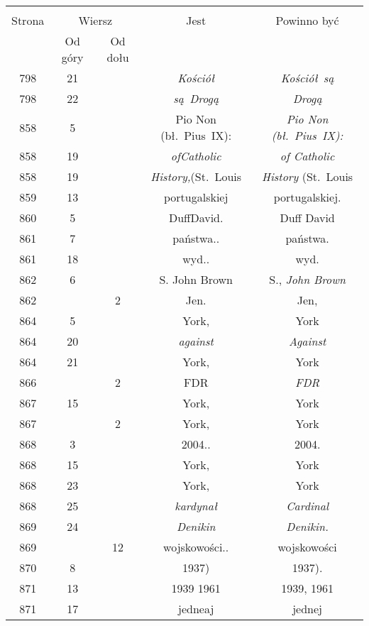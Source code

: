 \documentclass[a4paper,11pt]{article}
\begin{document}
\begin{center}
  \begin{tabular}{|c|c|c|c|c|}
    \hline
    & \multicolumn{2}{c|}{} & & \\
    Strona & \multicolumn{2}{c|}{Wiersz} & Jest
                              & Powinno być \\ \cline{2-3}
    & Od góry & Od dołu & & \\
    \hline
    798 & 21 & & \textit{Kościół} & \textit{Kościół~są} \\
    798 & 22 & & \textit{są~Drogą} & \textit{Drogą} \\
    858 &  5 & & Pio Non (bł.~Pius~IX):
           & \textit{Pio Non (bł.~Pius~IX):} \\
    858 & 19 & & \textit{ofCatholic} & \textit{of Catholic} \\
    858 & 19 & & \textit{History,}(St.~Louis
           & \textit{History} (St.~Louis \\
    859 & 13 & & portugalskiej & portugalskiej. \\
    860 &  5 & & DuffDavid. & Duff David \\
    861 &  7 & & państwa.. & państwa. \\
    861 & 18 & & wyd.. & wyd. \\
    862 &  6 & & S. John Brown & S., \textit{John Brown} \\
    862 & &  2 & Jen. & Jen, \\
    864 &  5 & & York, & York \\
    864 & 20 & & \textit{against} & \textit{Against} \\
    864 & 21 & & York, & York \\
    866 & &  2 & FDR & \textit{FDR} \\
    867 & 15 & & York, & York \\
    867 & &  2 & York, & York \\
    868 &  3 & & 2004.. & 2004. \\
    868 & 15 & & York, & York \\
    868 & 23 & & York, & York \\
    868 & 25 & & \textit{kardynał} & \textit{Cardinal} \\
    869 & 24 & & \textit{Denikin} & \textit{Denikin.} \\
    869 & & 12 & wojskowości.. & wojskowości \\
    870 &  8 & & 1937) & 1937). \\
    871 & 13 & & 1939 1961 & 1939, 1961 \\
    871 & 17 & & jedneaj & jednej \\

\end{tabular}
\end{center}
\end{document}
